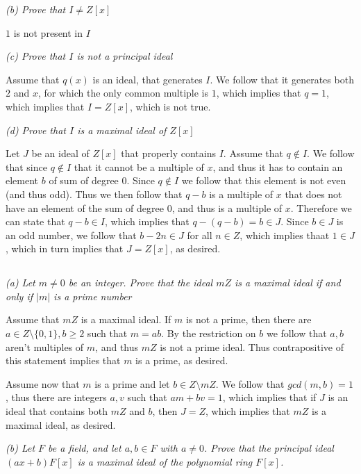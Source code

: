 \documentclass[11pt,oneside,titlepage]{book}
\newcommand{\set}[1]{\{ #1 \}}
\begin{document}
\textit{(b) Prove that $I \neq Z[x]$}

$1$ is not present in $I$

\textit{(c) Prove that $I$ is not a principal ideal}

Assume that $q(x)$ is an ideal, that generates $I$. We follow that it
generates both $2$ and $x$, for which the only common multiple is $1$,
which implies that $q = 1$, which implies that $I = Z[x]$, which is
not true.

\textit{(d) Prove that $I$ is a maximal ideal of $Z[x]$}

Let $J$ be an ideal of $Z[x]$ that properly contains $I$.  Assume that
$q \notin I$. We follow that since $q \notin I$ that it cannot be a
multiple of $x$, and thus it has to contain an element $b$ of sum of
degree $0$. Since $q \notin I$ we follow that this element is not even
(and thus odd). Thus we then follow that $q - b$ is a multiple of $x$
that does not have an element of the sum of degree $0$, and thus is a
multiple of $x$. Therefore we can state that $q - b \in I$, which
implies that $q - (q - b) = b \in J$. Since $b \in J$ is an odd
number, we follow that $b - 2n \in J$ for all $n \in Z$, which implies
thaat $1 \in J$, which in turn implies that $J = Z[x]$, as desired.

\subsection{}

\textit{(a) Let $m \neq 0$ be an integer. Prove that the ideal $mZ$ is
a maximal ideal if and only if $|m|$ is a prime number}

Assume that $mZ$ is a maximal ideal. If $m$ is not a prime, then there are
$a \in Z \setminus \set{0, 1}, b \geq 2$ such that $m = ab$. By the restriction on
$b$ we follow that $a, b$ aren't multiples of $m$, and thus $mZ$ is not a prime ideal.
Thus contrapositive of this statement implies that $m$ is a prime, as desired.

Assume now that $m$ is a prime and let $b \in Z \setminus mZ$. We
follow that $gcd(m, b) = 1$, thus there are integers $a, v$ such that
$am + bv = 1$, which implies that if $J$ is an ideal that contains both $mZ$ and $b$,
then $J = Z$, which implies that $mZ$ is a maximal ideal, as desired.

\textit{(b) Let $F$ be a field, and let $a, b \in F$ with $a \neq
  0$. Prove that the principal ideal $(ax + b)F[x]$ is a maximal ideal
  of the polynomial ring $F[x]$.}
\end{document}
